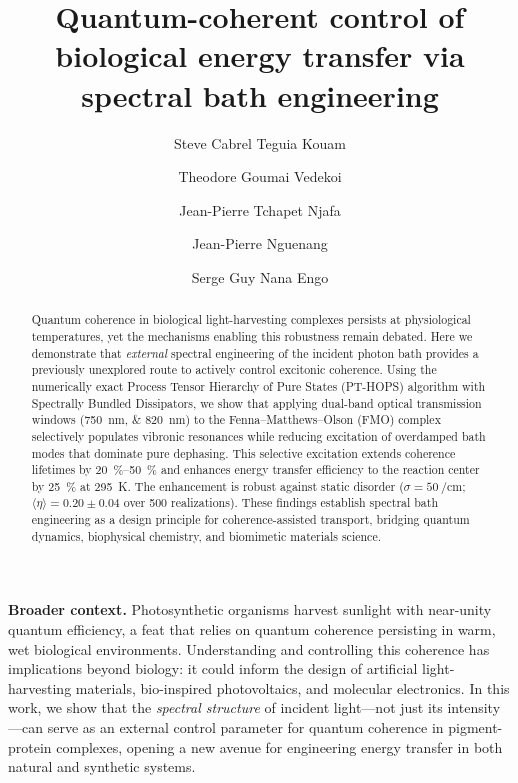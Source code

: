 \documentclass[11pt,a4paper]{article}
\title{\textbf{Quantum-coherent control of biological energy transfer via spectral bath engineering}}
\author[1,*]{Steve Cabrel Teguia Kouam}
\author[2]{Theodore Goumai Vedekoi}
\author[2]{Jean-Pierre Tchapet Njafa}
\author[1]{Jean-Pierre Nguenang}
\author[2]{Serge Guy Nana Engo}
\affil[1]{\small Department of Physics, Faculty of Science, University of Douala, Cameroon}
\affil[2]{\small Department of Physics, Faculty of Science, University of Yaoundé I, Cameroon}
\affil[*]{\textit{Corresponding author: steve.teguia@facsciences-uy1.cm}}
\date{\vspace{-5ex}}
\begin{document}
\maketitle

\noindent\textbf{Broader context.}
Photosynthetic organisms harvest sunlight with near-unity quantum efficiency, a feat that relies on quantum coherence persisting in warm, wet biological environments. Understanding and controlling this coherence has implications beyond biology: it could inform the design of artificial light-harvesting materials, bio-inspired photovoltaics, and molecular electronics. In this work, we show that the \textit{spectral structure} of incident light---not just its intensity---can serve as an external control parameter for quantum coherence in pigment-protein complexes, opening a new avenue for engineering energy transfer in both natural and synthetic systems.

\vspace{1em}

\begin{abstract}
Quantum coherence in biological light-harvesting complexes persists at physiological temperatures, yet the mechanisms enabling this robustness remain debated. Here we demonstrate that \textit{external} spectral engineering of the incident photon bath provides a previously unexplored route to actively control excitonic coherence. Using the numerically exact Process Tensor Hierarchy of Pure States (PT-HOPS) algorithm with Spectrally Bundled Dissipators, we show that applying dual-band optical transmission windows (\SIlist{750;820}{\nano\meter}) to the Fenna--Matthews--Olson (FMO) complex selectively populates vibronic resonances while reducing excitation of overdamped bath modes that dominate pure dephasing. This selective excitation extends coherence lifetimes by \SIrange{20}{50}{\percent} and enhances energy transfer efficiency to the reaction center by \SI{25}{\percent} at \SI{295}{\kelvin}. The enhancement is robust against static disorder ($\sigma = \SI{50}{\per\centi\meter}$; $\langle\eta\rangle = 0.20 \pm 0.04$ over \num{500} realizations). These findings establish spectral bath engineering as a design principle for coherence-assisted transport, bridging quantum dynamics, biophysical chemistry, and biomimetic materials science.
\end{abstract}
\end{document}

